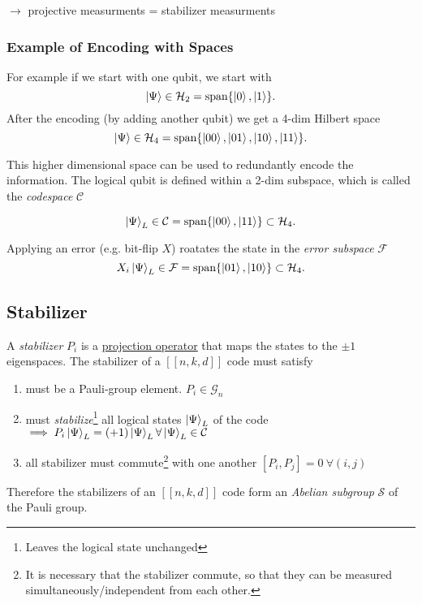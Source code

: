 $\rightarrow$ projective measurments = stabilizer measurments

\subsubsection{Example of Encoding with Spaces}
For example if we start with one qubit, we start with 
\begin{equation}
    \ket{\Psi} \in \mathcal{H}_2 = \text{span}\{\ket{0},\ket{1} \}.
\end{equation}
After the encoding (by adding another qubit) we get a 4-dim Hilbert space 
\begin{equation}
    \ket{\Psi} \in \mathcal{H}_4 = \text{span}\{\ket{00},\ket{01},\ket{10},\ket{11} \}.
\end{equation}

This higher dimensional space can be used to redundantly encode the information.
The logical qubit is defined within a 2-dim subspace, which is called the \textit{codespace} $\mathcal{C}$

\begin{equation}
    \ket{\Psi}_L \in \mathcal{C} = \text{span}\{\ket{00},\ket{11} \} \subset \mathcal{H}_4.
\end{equation}

Applying an error (e.g. bit-flip $X$) roatates the state in the \textit{error subspace} $\mathcal{F}$
\begin{equation}
    X_i \ket{\Psi}_L \in \mathcal{F} = \text{span}\{\ket{01},\ket{10} \} \subset \mathcal{H}_4.
\end{equation} 


\subsection{Stabilizer}\label{sec:basic.qc.stabilizer}

A \textit{stabilizer} $P_i$ is a 
\hyperref[sec:basic.math.projection_operator]{projection operator} 
that maps the states to the $\pm 1$ eigenspaces.
The stabilizer of a $[[n,k,d]]$ code must satisfy
\begin{enumerate}
    \item must be a Pauli-group element. $P_i \in \mathcal{G}_n$ 
    \item must \textit{stabilize}\footnote{Leaves the logical state unchanged} all logical states $\ket{\Psi}_L$ of the code \\
    $\implies P_i \ket{\Psi}_L = (+1) \ket{\Psi}_L \forall \ket{\Psi}_L \in \mathcal{C} $ 
    \item all stabilizer must commute\footnote{
It is necessary that the stabilizer commute, so that they can be measured simultaneously/independent from each other. 
    } with one another $[P_i,P_j]=0 \ \forall (i,j)$
\end{enumerate}
Therefore the stabilizers of an $[[n,k,d]]$ code form an \textit{Abelian subgroup} $\mathcal{S}$ of the Pauli group.

